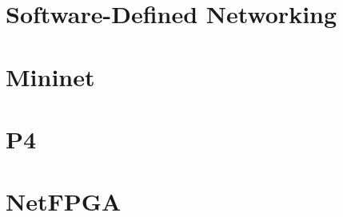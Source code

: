 \section{Software-Defined Networking}
\label{software_defined_networking}


\section{Mininet}
\label{mininet}


\section{P4}
\label{p4}


\section{NetFPGA}
\label{netfpga}


